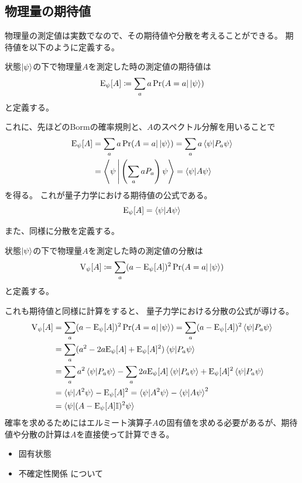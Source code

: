 \subsection{物理量の期待値}
物理量の測定値は実数でなので、その期待値や分散を考えることができる。
期待値を以下のように定義する。
\begin{Def}
  状態$\ket{\psi}$の下で物理量$A$を測定した時の測定値の期待値は
  $$
    \text{E}_\psi[A] \coloneqq \sum_a a\Pr(A=a | \ket{\psi})
  $$
  と定義する。
\end{Def}
これに、先ほどのBormの確率規則と、$A$のスペクトル分解を用いることで
\begin{align}
  \text{E}_\psi[A] &= \sum_a a\Pr(A=a | \ket{\psi}) = \sum_a a \braket{\psi|P_a\psi} \\
  &= \Braket{\psi| \left(\sum_a aP_a\right)\psi} = \braket{\psi|A\psi}
\end{align}
を得る。
これが量子力学における期待値の公式である。
\begin{equation}
  \text{E}_\psi[A] = \braket{\psi|A\psi}
\end{equation}

また、同様に分散を定義する。
\begin{Def}
  状態$\ket{\psi}$の下で物理量$A$を測定した時の測定値の分散は
  $$
    \text{V}_\psi[A] \coloneqq \sum_a (a-\text{E}_\psi[A])^2\Pr(A=a | \ket{\psi})
  $$
  と定義する。
\end{Def}
これも期待値と同様に計算をすると、
量子力学における分散の公式が導ける。
\begin{align}
  \text{V}_\psi[A] &= \sum_a (a-\text{E}_\psi[A])^2\Pr(A=a | \ket{\psi}) = \sum_a (a-\text{E}_\psi[A])^2\braket{\psi|P_a\psi} \\
  &= \sum_a (a^2 - 2a\text{E}_\psi[A] + \text{E}_\psi[A]^2)\braket{\psi|P_a\psi} \\
  &= \sum_a a^2 \braket{\psi|P_a\psi} - \sum_a 2a\text{E}_\psi[A]\braket{\psi|P_a\psi} + \text{E}_\psi[A]^2 \braket{\psi|P_a\psi} \\
  &= \braket{\psi|A^2\psi} - \text{E}_\psi[A]^2 = \braket{\psi|A^2\psi} - \braket{\psi|A\psi}^2 \\
  &= \braket{\psi|(A-\text{E}_\psi[A]\mathbb{I})^2\psi}
\end{align}
確率を求めるためにはエルミート演算子$A$の固有値を求める必要があるが、期待値や分散の計算は$A$を直接使って計算できる。

\begin{Memo}
  \begin{itemize}
    \item 固有状態
    \item 不確定性関係
    について
  \end{itemize}
\end{Memo}

